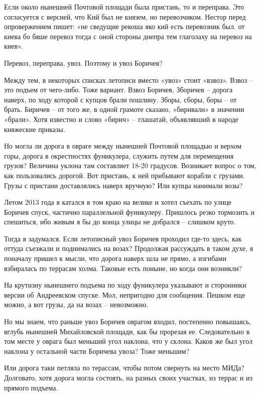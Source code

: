 Если около нынешней Почтовой площади была пристань, то и переправа. Это согласуется с версией, что Кий был не князем, но перевозчиком. Нестор перед опровержением пишет: «не сведущие рекоша яко кий есть перевозник был. от киева бо бяше перевоз тогда с оной стороны днепра тем глаголаху на перевоз на киев».

Перевоз, переправа, увоз. Поэтому и увоз Боричев?

Между тем, в некоторых списках летописи вместо «увоз» стоит «взвоз». Взвоз – это подъем от чего-либо. Тоже вариант. Взвоз Боричев, Зборичев – дорога наверх, по ходу которой с купцов брали пошлину. Зборы, сборы, боры – от брать. Биричев – от того же, в одной грамоте сказано, «биривали» в значении «брали». Хотя известно и слово «бирич» – глашатай, объявлявший в народе княжеские приказы.

Но могла ли дорога в овраге между нынешней Почтовой площадью и верхом горы, дорога в окрестностях фуникулера, служить путем для перемещения грузов? Величина уклона там составляет 18-20 градусов. Возникает вопрос о том, как пользовались дорогой. Вот пристань, к ней прибывают корабли с грузами. Грузы с пристани доставлялись наверх вручную? Или купцы нанимали возы?

Летом 2013 года я катался в том краю на велике и хотел съехать по улице Боричев спуск, частично параллельной фуникулеру. Пришлось резко тормозить и спешиться, ибо живым я бы до конца улицы не добрался – слишком круто.

Тогда я задумался. Если летописный увоз Боричев проходил где-то здесь, как оттуда съезжали и поднимались на возах? Продолжая рассуждать в таком духе, я поначалу пришел к мысли, что дорога наверх шла не прямо, а изгибами взбиралась по террасам холма.  Таковые есть поныне, но когда они возникли?

На крутизну нынешнего подъема по ходу фуникулера указывают и сторонники версии об Андреевском спуске. Мол, непригодно для сообщения. Пешком еще можно, а вот грузы, да на возах – невозможно. 

Но мы знаем, что раньше увоз Боричев оврагом входил, постепенно повышаясь, вглубь нынешней Михайловской площади, как бы прорезая ее. Следовательно в том месте у оврага был меньший угол наклона, что у склона. Каков же был угол наклона у остальной части Боричева увоза? Тоже меньшим? 

Или дорога таки петляла по терассам, чтобы потом свернуть на место МИДа? Долговато, хотя дорога могла состоять, на разных своих участках, из террас и из прямого подъема.

